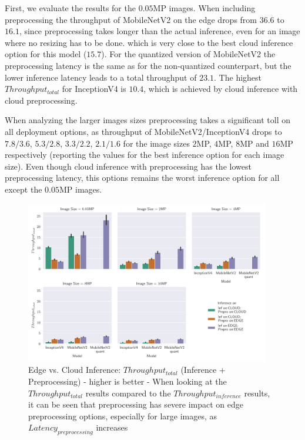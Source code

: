 First, we evaluate the results for the $0.05$MP images.
When including preprocessing the throughput of MobileNetV2 on the edge drops from $36.6$ to $16.1$, since preprocessing takes longer than the actual inference, even for an image where no resizing has to be done.
which is very close to the best cloud inference option for this model ($15.7$).
For the quantized version of MobileNetV2 the preprocessing latency is the same as for the non-quantized counterpart, but the lower inference latency leads to a total throughput of $23.1$.
The highest $Throughput_{total}$ for InceptionV4 is $10.4$, which is achieved by cloud inference with cloud preprocessing.

When analyzing the larger images sizes preprocessing takes a significant toll on all deployment options, as throughput of MobileNetV2/InceptionV4 drops to $7.8/3.6$, $5.3/2.8$, $3.3/2.2$, $2.1/1.6$ for the image sizes $2$MP, $4$MP, $8$MP and $16$MP respectively (reporting the values for the best inference option for each image size).
Even though cloud inference with preprocessing has the lowest preprocessing latency, this options remains the worst inference option for all except the $0.05$MP images.

\begin{figure}[!htb]
\centering
\includegraphics[width=0.95\textwidth]{./Bilder/single_plots/edge_vs_cloud_plots/Edge_vs_Cloud_Inference_Throughput_with_Preprocessing.pdf}
\caption[Edge vs. Cloud Inference:  $Throughput_{total}$ - higher is better]{Edge vs. Cloud Inference:  $Throughput_{total}$ (Inference + Preprocessing) - higher is better - 
When looking at the $Throughput_{total}$ results compared to the $Throughput_{inference}$ results, it can be seen that preprocessing has severe impact on edge preprocessing options, especially for large images, as $Latency_{preprocessing}$ increases}
\label{fig:EdgeVsCloudTotalThroughput}
\end{figure}





